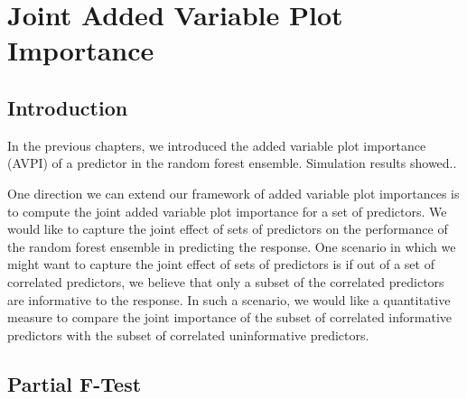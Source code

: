 \documentclass[12pt,twoside]{reedthesis}
\theoremstyle{definition}
\theoremstyle{definition}
\theoremstyle{definition}
\theoremstyle{remark}
\begin{document}
\chapter{Joint Added Variable Plot
Importance}\label{joint-added-variable-plot-importance}

\section{Introduction}\label{introduction-4}

In the previous chapters, we introduced the added variable plot
importance (AVPI) of a predictor in the random forest ensemble.
Simulation results showed..

One direction we can extend our framework of added variable plot
importances is to compute the joint added variable plot importance for a
set of predictors. We would like to capture the joint effect of sets of
predictors on the performance of the random forest ensemble in
predicting the response. One scenario in which we might want to capture
the joint effect of sets of predictors is if out of a set of correlated
predictors, we believe that only a subset of the correlated predictors
are informative to the response. In such a scenario, we would like a
quantitative measure to compare the joint importance of the subset of
correlated informative predictors with the subset of correlated
uninformative predictors.

\section{Partial F-Test}\label{partial-f-test}
\end{document}
